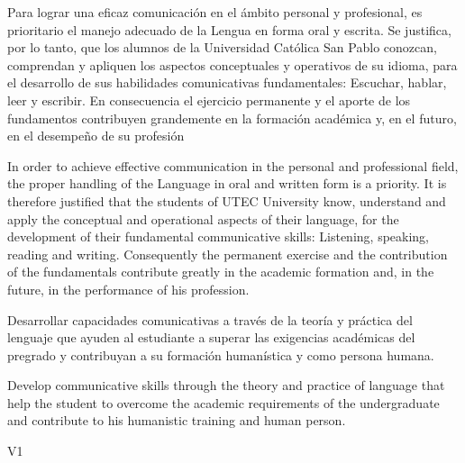 \begin{syllabus}


\begin{justification}
Para lograr una eficaz comunicación en el ámbito personal y profesional, es prioritario el manejo adecuado de la Lengua en forma oral y escrita. Se justifica, por lo tanto, que los alumnos de la Universidad Católica San Pablo conozcan, comprendan y apliquen los aspectos conceptuales y operativos de su idioma, para el desarrollo de sus habilidades comunicativas fundamentales: Escuchar, hablar, leer y escribir.
En consecuencia el ejercicio permanente y el aporte de los fundamentos contribuyen grandemente en la formación académica y, en el futuro, en el desempeño de su profesión

In order to achieve effective communication in the personal and professional field, the proper handling of the Language in oral and written form is a priority. It is therefore justified that the students of UTEC University know, understand and apply the conceptual and operational aspects of their language, for the development of their fundamental communicative skills: Listening, speaking, reading and writing.
Consequently the permanent exercise and the contribution of the fundamentals contribute greatly in the academic formation and, in the future, in the performance of his profession.
\end{justification}

\begin{goals}
\item Desarrollar capacidades comunicativas a través de la teoría y práctica del lenguaje que ayuden al estudiante a superar las exigencias académicas del pregrado y contribuyan a su formación humanística y como persona humana.

\item Develop communicative skills through the theory and practice of language that help the student to overcome the academic requirements of the undergraduate and contribute to his humanistic training and human person.
\end{goals}

\begin{outcomes}{V1}
    \item {}
    \item {}
\end{outcomes}


\end{syllabus}
